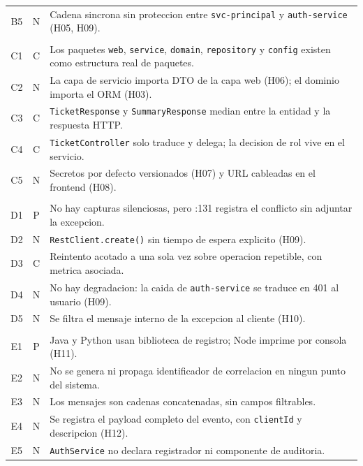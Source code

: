 \documentclass[10pt,a4paper]{article}
\begin{document}
\begin{xltabular}{\textwidth}{@{}c c X@{}}
B5 & N & Cadena sincrona sin proteccion entre \texttt{svc-principal} y \texttt{auth-service} (H05, H09).\\
\addlinespace
{}\\
C1 & C & Los paquetes \texttt{web}, \texttt{service}, \texttt{domain}, \texttt{repository} y \texttt{config} existen como estructura real de paquetes.\\
C2 & N & La capa de servicio importa DTO de la capa web (H06); el dominio importa el ORM (H03).\\
C3 & C & \texttt{TicketResponse} y \texttt{SummaryResponse} median entre la entidad y la respuesta HTTP.\\
C4 & C & \texttt{TicketController} solo traduce y delega; la decision de rol vive en el servicio.\\
C5 & N & Secretos por defecto versionados (H07) y URL cableadas en el frontend (H08).\\
\addlinespace
{}\\
D1 & P & No hay capturas silenciosas, pero :131 registra el conflicto sin adjuntar la excepcion.\\
D2 & N & \texttt{RestClient.create()} sin tiempo de espera explicito (H09).\\
D3 & C & Reintento acotado a una sola vez sobre operacion repetible, con metrica asociada.\\
D4 & N & No hay degradacion: la caida de \texttt{auth-service} se traduce en 401 al usuario (H09).\\
D5 & N & Se filtra el mensaje interno de la excepcion al cliente (H10).\\
\addlinespace
{}\\
E1 & P & Java y Python usan biblioteca de registro; Node imprime por consola (H11).\\
E2 & N & No se genera ni propaga identificador de correlacion en ningun punto del sistema.\\
E3 & N & Los mensajes son cadenas concatenadas, sin campos filtrables.\\
E4 & N & Se registra el payload completo del evento, con \texttt{clientId} y descripcion (H12).\\
E5 & N & \texttt{AuthService} no declara registrador ni componente de auditoria.\\
\end{xltabular}
\end{document}
